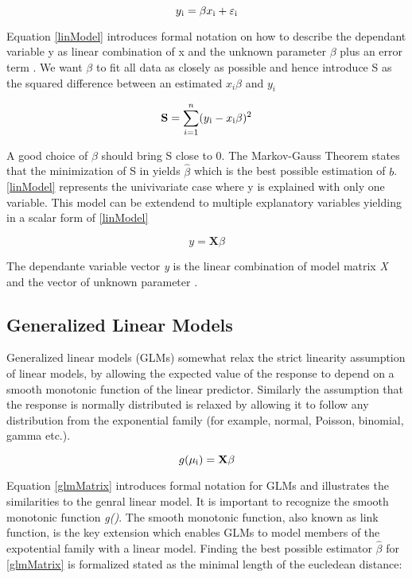 \documentclass{article}
\begin{document}
    \begin{equation}  \label{linModel} y\textsubscript{i} = \beta x\textsubscript{i} + \varepsilon\textsubscript{i} \end{equation}

    Equation \ref{linModel} introduces formal notation on how to describe the dependant variable y as linear combination of x and the unknown parameter $\beta$ plus an error term \textepsilon. We want $\beta$ to fit all data as closely as possible and hence introduce S as the squared difference between an estimated $x_i \beta$ and $y_i$

    \begin{equation} \label{sumSquares} \mathbf{S} =  \sum_{i=1}^{n}(y\textsubscript{i} - x\textsubscript{i}\beta)^{2} \end{equation}

    A good choice of $\beta$ should bring S close to 0. The  Markov-Gauss Theorem states that the minimization of S in yields $\widehat{\beta}$ which is the best possible estimation of $b$. \ref{linModel} represents the univivariate case where y is explained with only one variable. This model can be extendend to multiple explanatory variables yielding in a scalar form of \ref{linModel}

    \begin{equation}  \label{linMatrixModel} y =  \mathbf{X} \beta \end{equation}

     The dependante variable vector \textit{y} is the linear combination of model matrix \textit{X} and the vector of unknown parameter \textbeta.

    \subsection{Generalized Linear Models}
    Generalized linear models (GLMs) somewhat relax the strict linearity assumption of linear models, by allowing the expected value of the response to depend on a smooth monotonic function of the linear predictor. Similarly the assumption that the response is normally distributed is relaxed by allowing it to follow any distribution from the exponential family (for example, normal, Poisson, binomial, gamma etc.).

    \begin{equation} \label{glmMatrix} g(\mu\textsubscript{i}) = \mathbf{X} \beta \end{equation}

    Equation \ref{glmMatrix} introduces formal notation for GLMs and illustrates the similarities to the genral linear model. It is important to recognize the smooth monotonic function \textit{g()}. The smooth monotonic function, also known as link function, is the key extension which enables GLMs to model members of the expotential family with a linear model. Finding the best possible estimator $\widehat{\beta}$ for \ref{glmMatrix} is formalized stated as the minimal length of the eucledean distance:
\end{document}
